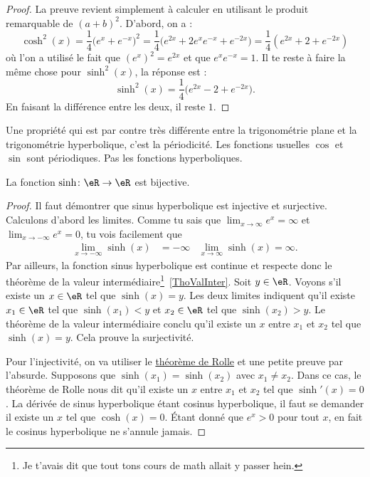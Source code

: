 \begin{proof}
La preuve revient simplement à calculer en utilisant le produit remarquable de $(a+b)^2$. D'abord, on a :
\[
  \cosh^2(x)=\frac{1}{ 4 }\big(  e^{x}+ e^{-x} \big)^2=\frac{1}{ 4 }\big(  e^{2x}+2 e^{x} e^{-x}+ e^{-2x} \big)=\frac{1}{ 4 }( e^{2x}+2+ e^{-2x})
\]
où l'on a utilisé le fait que $(e^{x})^2= e^{2x}$ et que $ e^{x} e^{-x}=1$. Il te reste à faire la même chose pour $\sinh^2(x)$, la réponse est :
\[
  \sinh^2(x)=\frac{1}{ 4 }\big(  e^{2x}-2+ e^{-2x} \big).
\]
En faisant la différence entre les deux, il reste $1$.
\end{proof}
Une propriété qui est par contre très différente entre la trigonométrie plane et la trigonométrie hyperbolique, c'est la périodicité. Les fonctions usuelles $\cos$ et $\sin$ sont périodiques. Pas les fonctions hyperboliques.

\begin{proposition}
La fonction $\sinh\colon \eR\to\eR $ est bijective.
\end{proposition}

\begin{proof}
Il faut démontrer que sinus hyperbolique est injective et surjective. Calculons d'abord les limites. Comme tu sais que $\lim_{x\to\infty} e^{x}=\infty$ et $\lim_{x\to-\infty} e^{x}=0$, tu vois facilement que
\begin{align}
\lim_{x\to-\infty}\sinh(x)&=-\infty	&\lim_{x\to\infty}\sinh(x)=\infty.
\end{align}
Par ailleurs, la fonction sinus hyperbolique est continue et respecte donc le théorème de la valeur intermédiaire\footnote{Je t'avais dit que tout tons cours de math allait y passer hein.}~\ref{ThoValInter}. Soit $y\in\eR$. Voyons s'il existe un $x\in\eR$ tel que $\sinh(x)=y$. Les deux limites indiquent qu'il existe $x_1\in\eR$ tel que $\sinh(x_1)<y$ et $x_2\in\eR$ tel que $\sinh(x_2)>y$. Le théorème de la valeur intermédiaire conclu qu'il existe un $x$ entre $x_1$ et $x_2$ tel que $\sinh(x)=y$. Cela prouve la surjectivité.

Pour l'injectivité, on va utiliser le \href{http://fr.wikipedia.org/wiki/Théorème_de_Rolle}{théorème de Rolle} et une petite preuve par l'absurde. Supposons que $\sinh(x_1)=\sinh(x_2)$ avec $x_1\neq x_2$. Dans ce cas, le théorème de Rolle nous dit qu'il existe un $x$ entre $x_1$ et $x_2$ tel que $\sinh'(x)=0$. La dérivée de sinus hyperbolique étant cosinus hyperbolique, il faut se demander il existe un $x$ tel que $\cosh(x)=0$. Étant donné que $ e^{x}>0$ pour tout $x$, en fait le cosinus hyperbolique ne s'annule jamais.
\end{proof}

